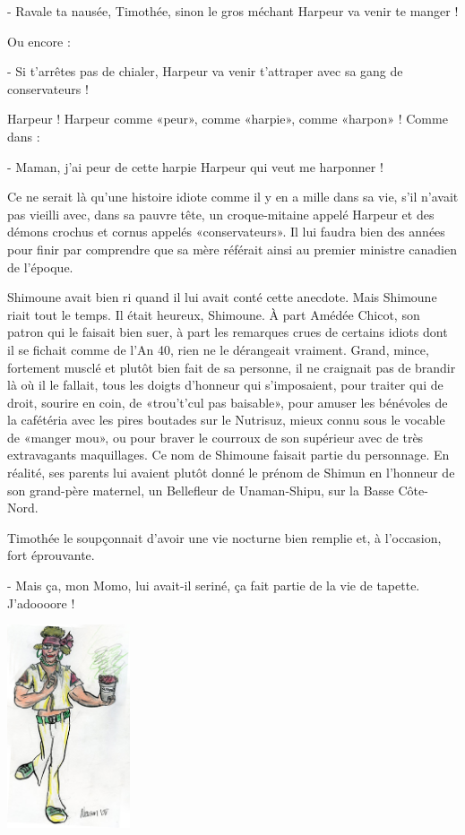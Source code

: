 - Ravale ta nausée, Timothée, sinon le gros méchant Harpeur va venir te manger !

Ou encore :

- Si t’arrêtes pas de chialer, Harpeur va venir t’attraper avec sa gang de conservateurs !

Harpeur ! Harpeur comme «peur», comme «harpie», comme «harpon» ! Comme dans :

- Maman, j’ai peur de cette harpie Harpeur qui veut me harponner !

Ce ne serait là qu’une histoire idiote comme il y en a mille dans sa vie, s’il n’avait pas vieilli avec, dans sa pauvre tête, un croque-mitaine appelé Harpeur et des démons crochus et cornus appelés «conservateurs». Il lui faudra bien des années pour finir par comprendre que sa mère référait ainsi au premier ministre canadien de l’époque.

Shimoune avait bien ri quand il lui avait conté cette anecdote. Mais Shimoune riait tout le temps. Il était heureux, Shimoune. À part Amédée Chicot, son patron qui le faisait bien suer, à part les remarques crues de certains idiots dont il se fichait comme de l’An 40, rien ne le dérangeait vraiment. Grand, mince, fortement musclé et plutôt bien fait de sa personne, il ne craignait pas de brandir là où il le fallait, tous les doigts d’honneur qui s’imposaient, pour traiter qui de droit, sourire en coin, de «trou’t’cul pas baisable», pour amuser les bénévoles de la cafétéria avec les pires boutades sur le Nutrisuz, mieux connu sous le vocable de «manger mou», ou pour braver le courroux de son supérieur avec de très extravagants maquillages. Ce nom de Shimoune faisait partie du personnage. En réalité, ses parents lui avaient plutôt donné le prénom de Shimun en l’honneur de son grand-père maternel, un Bellefleur de Unaman-Shipu, sur la Basse Côte-Nord.

Timothée le soupçonnait d’avoir une vie nocturne bien remplie et, à l’occasion, fort éprouvante.

- Mais ça, mon Momo, lui avait-il seriné, ça fait partie de la vie de tapette. J’adoooore !

\begin{floatingfigure}[l]{40mm}
\includegraphics[height=60mm]{corps/chapitre3/img/simon.jpg}
\end{floatingfigure}

